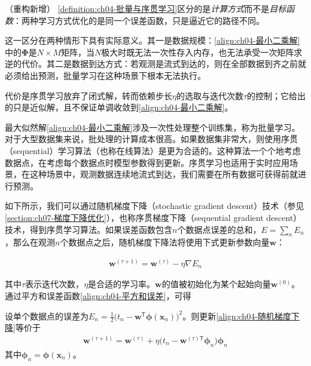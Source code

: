 \documentclass[../../main.tex]{subfiles}
\begin{document}
\begin{remark}（重构新增）
\cref{definition:ch04-批量与序贯学习}区分的是\emph{计算方式}而不是\emph{目标函数}：两种学习方式优化的是同一个误差函数，只是逼近它的路径不同。

这一区分在两种情形下具有实际意义。其一是数据规模：\eqref{align:ch04-最小二乘解}中的$\boldsymbol{\Phi}$是$N\times M$矩阵，当$N$极大时既无法一次性存入内存，也无法承受一次矩阵求逆的代价。其二是数据到达方式：若观测是流式到达的，则在全部数据到齐之前就必须给出预测，批量学习在这种场景下根本无法执行。

代价是序贯学习放弃了闭式解，转而依赖步长$\eta$的选取与迭代次数$\tau$的控制；它给出的只是近似解，且不保证单调收敛到\eqref{align:ch04-最小二乘解}。
\end{remark}

最大似然解\eqref{align:ch04-最小二乘解}涉及一次性处理整个训练集，称为批量学习。对于大型数据集来说，批处理的计算成本很高。如果数据集非常大，则使用序贯（sequential）学习算法（也称在线算法）是更为合适的。这种算法一个个地考虑数据点，在考虑每个数据点时模型参数得到更新。序贯学习也适用于实时应用场景，在这种场景中，观测数据连续地流式到达，我们需要在所有数据可获得前就进行预测。

如下所示，我们可以通过随机梯度下降（stochastic gradient descent）技术（参见\cref{section:ch07-梯度下降优化}），也称序贯梯度下降（sequential gradient descent）技术，得到序贯学习算法。如果误差函数包含$n$个数据点误差的总和，$E=\sum_n E_n$，那么在观测$n$个数据点之后，随机梯度下降法将使用下式更新参数向量$\boldsymbol{w}$：

\begin{align}
  \boldsymbol{w}^{(\tau+1)}=\boldsymbol{w}^{(\tau)}-\eta\nabla E_n
  \label{align:ch04-随机梯度下降}
\end{align}

其中$\tau$表示迭代次数，$\eta$是合适的学习率。$\boldsymbol{w}$的值被初始化为某个起始向量$\boldsymbol{w}^{(0)}$。通过平方和误差函数\eqref{align:ch04-平方和误差}，可得

\begin{proposition}[LMS更新公式]\label{proposition:ch04-LMS更新}
设单个数据点的误差为$E_n=\frac{1}{2}\bigl(t_n-\boldsymbol{w}^{\mathsf{T}}\boldsymbol{\phi}(\boldsymbol{x}_n)\bigr)^2$。则更新\eqref{align:ch04-随机梯度下降}等价于
\begin{align}
  \boldsymbol{w}^{(\tau+1)}=\boldsymbol{w}^{(\tau)}+\eta\bigl(t_n-\boldsymbol{w}^{(\tau)\mathsf{T}}\boldsymbol{\phi}_n\bigr)\boldsymbol{\phi}_n
  \label{align:ch04-LMS更新}
\end{align}
其中$\boldsymbol{\phi}_n=\boldsymbol{\phi}(\boldsymbol{x}_n)$。
\end{proposition}
\end{document}
